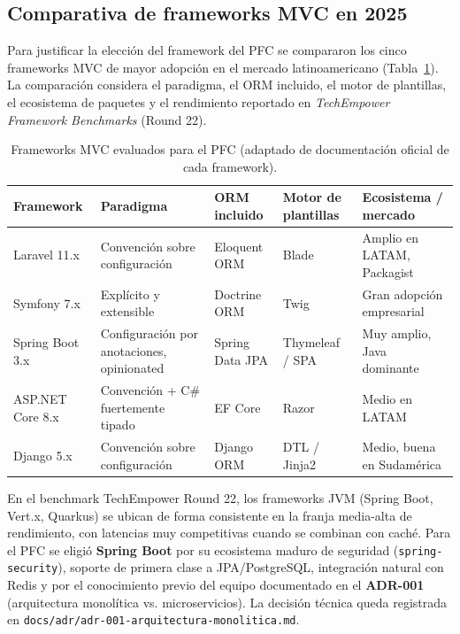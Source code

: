 \subsection{Comparativa de frameworks MVC en 2025}

Para justificar la elección del framework del PFC se compararon los cinco frameworks MVC de mayor adopción en el
mercado latinoamericano (Tabla~\ref{tab:frameworks}). La comparación considera el paradigma, el ORM incluido, el
motor de plantillas, el ecosistema de paquetes y el rendimiento reportado en \textit{TechEmpower Framework
Benchmarks} (Round 22).

\begin{table}[H]
\centering
\small
\setlength{\tabcolsep}{5pt}
\begin{tabular}{@{}p{2.6cm}p{3.4cm}p{2.6cm}p{2.6cm}p{3.2cm}@{}}
\toprule
\textbf{Framework} & \textbf{Paradigma} & \textbf{ORM incluido} & \textbf{Motor de plantillas} & \textbf{Ecosistema / mercado} \\
\midrule
Laravel 11.x & Convención sobre configuración & Eloquent ORM & Blade & Amplio en LATAM, Packagist \\
Symfony 7.x & Explícito y extensible & Doctrine ORM & Twig & Gran adopción empresarial \\
Spring Boot 3.x & Configuración por anotaciones, opinionated & Spring Data JPA & Thymeleaf / SPA & Muy amplio, Java dominante \\
ASP.NET Core 8.x & Convención + C\# fuertemente tipado & EF Core & Razor & Medio en LATAM \\
Django 5.x & Convención sobre configuración & Django ORM & DTL / Jinja2 & Medio, buena en Sudamérica \\
\bottomrule
\end{tabular}
\caption{Frameworks MVC evaluados para el PFC (adaptado de documentación oficial de cada framework).}
\label{tab:frameworks}
\end{table}

En el benchmark TechEmpower Round 22, los frameworks JVM (Spring Boot, Vert.x, Quarkus) se ubican de forma
consistente en la franja media-alta de rendimiento, con latencias muy competitivas cuando se combinan con caché.
Para el PFC se eligió \textbf{Spring Boot} por su ecosistema maduro de seguridad (\texttt{spring-security}),
soporte de primera clase a JPA/PostgreSQL, integración natural con Redis y por el conocimiento previo del equipo
documentado en el \textbf{ADR-001} (arquitectura monolítica vs. microservicios). La decisión técnica queda
registrada en \texttt{docs/adr/adr-001-arquitectura-monolitica.md}.